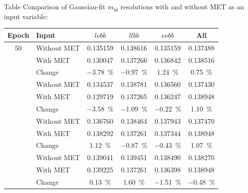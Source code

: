 \begin{frame}{Table}
Comparison of Gaussian-fit ${m_{b\bar{b}}}$ resolutions with and without
MET as an input variable:
\begin{table}
    \centering
    \small
    \begin{tabular}{clcccc}
        \toprule
        Epoch & Input & ${l\nu bb}$ & ${llbb}$ & ${\nu\nu bb}$ & All \\
        \midrule
        50
            & Without MET & 0.135159              & 0.138616              & 0.135159              & 0.137488 \\
            & With MET    & 0.130047              & 0.137266              & 0.136842              & 0.138516 \\
            & Change      & \qty{-3.78}{\percent} & \qty{-0.97}{\percent} & \qty{+1.24}{\percent} & \qty{+0.75}{\percent} \\
        \addlinespace
        100
            & Without MET & 0.134537              & 0.138781              & 0.136560              & 0.137430 \\
            & With MET    & 0.129719              & 0.137265              & 0.136247              & 0.138948 \\
            & Change      & \qty{-3.58}{\percent} & \qty{-1.09}{\percent} & \qty{-0.22}{\percent} & \qty{+1.10}{\percent} \\
        \addlinespace
        150
            & Without MET & 0.136760              & 0.138464              & 0.137943              & 0.137470 \\
            & With MET    & 0.138292              & 0.137261              & 0.137344              & 0.138948 \\
            & Change      & \qty{+1.12}{\percent} & \qty{-0.87}{\percent} & \qty{-0.43}{\percent} & \qty{+1.07}{\percent} \\
        \addlinespace
        500
            & Without MET & 0.139041              & 0.139451              & 0.138490              & 0.138270 \\
            & With MET    & 0.139225              & 0.137261              & 0.136398              & 0.138948 \\
            & Change      & \qty{+0.13}{\percent} & \qty{+1.60}{\percent} & \qty{-1.51}{\percent} & \qty{-0.48}{\percent} \\
        \bottomrule
    \end{tabular}
\end{table}

\end{frame}

